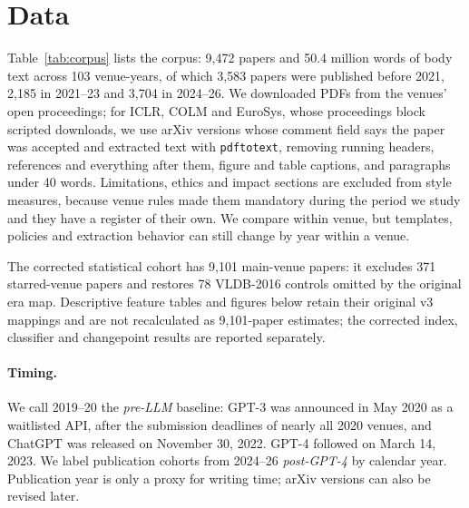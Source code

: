 \documentclass[10pt,twocolumn]{article}
\begin{document}
\section{Data}

\begin{table}[t]
\centering\small

\caption{Papers analyzed, by venue and publication year. OSDI, NSDI and MLSys are full proceedings; the other venues are random samples of 80--200 papers per year (ACL 2020 keeps long papers only). COLM and EuroSys ($^*$) are arXiv versions of accepted papers with no pre-LLM year; they appear in per-venue results but not in pooled statistics.}
\label{tab:corpus}
\end{table}

Table~\ref{tab:corpus} lists the corpus: 9,472 papers and 50.4 million words of body text across 103 venue-years, of which 3,583 papers were published before 2021, 2,185 in 2021--23 and 3,704 in 2024--26. We downloaded PDFs from the venues' open proceedings; for ICLR, COLM and EuroSys, whose proceedings block scripted downloads, we use arXiv versions whose comment field says the paper was accepted and extracted text with \texttt{pdftotext}, removing running headers, references and everything after them, figure and table captions, and paragraphs under 40 words. Limitations, ethics and impact sections are excluded from style measures, because venue rules made them mandatory during the period we study and they have a register of their own. We compare within venue, but templates, policies and extraction behavior can still change by year within a venue.

The corrected statistical cohort has 9,101 main-venue papers: it excludes 371 starred-venue papers and restores 78 VLDB-2016 controls omitted by the original era map. Descriptive feature tables and figures below retain their original v3 mappings and are not recalculated as 9,101-paper estimates; the corrected index, classifier and changepoint results are reported separately.

\paragraph{Timing.} We call 2019--20 the \emph{pre-LLM} baseline: GPT-3 was announced in May 2020 as a waitlisted API, after the submission deadlines of nearly all 2020 venues, and ChatGPT was released on November 30, 2022. GPT-4 followed on March 14, 2023. We label publication cohorts from 2024--26 \emph{post-GPT-4} by calendar year. Publication year is only a proxy for writing time; arXiv versions can also be revised later.
\end{document}
